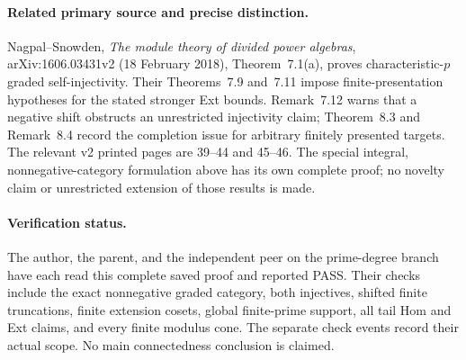 \paragraph{Related primary source and precise distinction.}
Nagpal--Snowden, \emph{The module theory of divided power algebras},
arXiv:1606.03431v2 (18 February 2018), Theorem~7.1(a), proves
characteristic-\(p\) graded self-injectivity.  Their Theorems~7.9
and~7.11 impose finite-presentation hypotheses for the stated stronger
Ext bounds.  Remark~7.12 warns that a negative shift obstructs an
unrestricted injectivity claim; Theorem~8.3 and Remark~8.4 record the
completion issue for arbitrary finitely presented targets.  The relevant
v2 printed pages are 39--44 and 45--46.  The special integral,
nonnegative-category formulation above has its own complete proof;
no novelty claim or unrestricted extension of those results is made.

\paragraph{Verification status.}
The author, the parent, and the independent peer on the prime-degree
branch have each read this complete saved proof and reported PASS.
Their checks include the exact nonnegative graded category, both
injectives, shifted finite truncations, finite extension cosets, global
finite-prime support, all tail Hom and Ext claims, and every finite
modulus cone.  The separate check events record their actual scope.
No main connectedness conclusion is claimed.
